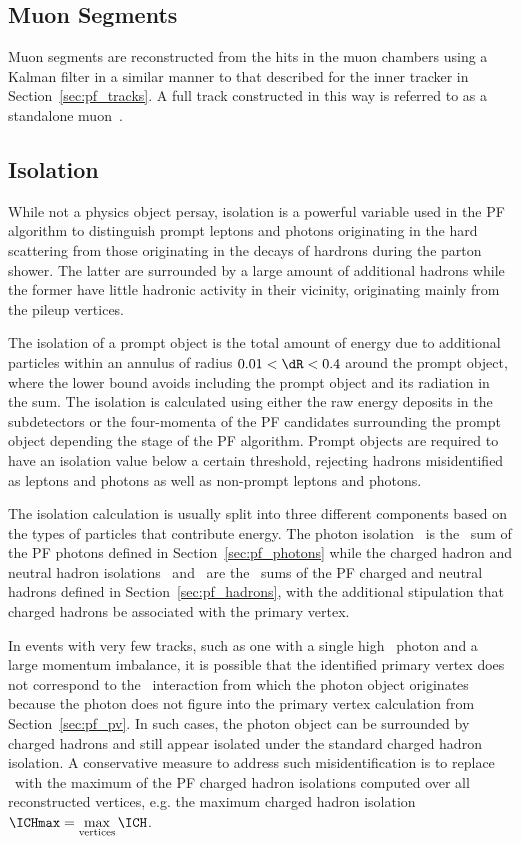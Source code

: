 \subsection{Muon Segments}
\label{sec:pf_segments}

Muon segments are reconstructed from the hits in the muon chambers using a Kalman filter in a similar manner to that described for the inner tracker in Section~\ref{sec:pf_tracks}.
A full track constructed in this way is referred to as a standalone muon~\cite{PF2017}.

\subsection{Isolation}
\label{sec:pf_iso}

While not a physics object persay, isolation is a powerful variable used in the PF algorithm to distinguish prompt leptons and photons originating in the hard scattering from those originating in the decays of hardrons during the parton shower. 
The latter are surrounded by a large amount of additional hadrons while the former have little hadronic activity in their vicinity, originating mainly from the pileup vertices.

The isolation of a prompt object is the total amount of energy due to additional particles within an annulus of radius $0.01 < \dR < 0.4$ around the prompt object, where the lower bound avoids including the prompt object and its radiation in the sum.
The isolation is calculated using either the raw energy deposits in the subdetectors or the four-momenta of the PF candidates surrounding the prompt object depending the stage of the PF algorithm.
Prompt objects are required to have an isolation value below a certain threshold, rejecting hadrons misidentified as leptons and photons as well as non-prompt leptons and photons.

The isolation calculation is usually split into three different components based on the types of particles that contribute energy.
The photon isolation \Ig\ is the \ET\ sum of the PF photons defined in Section~\ref{sec:pf_photons} while the charged hadron and neutral hadron isolations \ICH\ and \INH\ are the \pt\ sums of the PF charged and neutral hadrons defined in Section~\ref{sec:pf_hadrons}, with the additional stipulation that charged hadrons be associated with the primary vertex.

In events with very few tracks, such as one with a single high \pt\ photon and a large momentum imbalance, it is possible that the identified primary vertex does not correspond to the \Pp\Pp\ interaction from which the photon object originates because the photon does not figure into the primary vertex calculation from Section~\ref{sec:pf_pv}.
In such cases, the photon object can be surrounded by charged hadrons and still appear isolated under the standard charged hadron isolation.
A conservative measure to address such misidentification is to replace \ICH\ with the maximum of the PF charged hadron isolations computed over all reconstructed vertices, e.g. the maximum charged hadron isolation $\ICHmax = \max\limits_{\text{vertices}} \ICH$.

